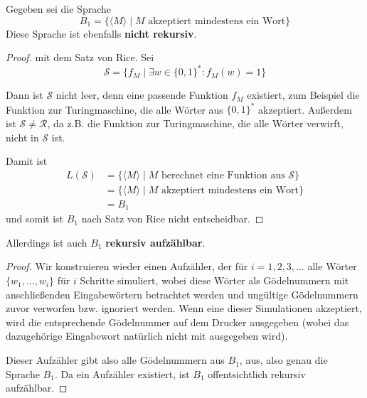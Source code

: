 Gegeben sei die Sprache
\[
	B_1 = \{ \langle M \rangle \mid M \text{ akzeptiert mindestens ein Wort} \}
\]
Diese Sprache ist ebenfalls \textbf{nicht rekursiv}.

\begin{proof} mit dem Satz von Rice.
Sei
\[
\mathcal{S} = \{f_M \mid \exists w \in \{0, 1\}^* : f_M(w) = 1\}
\]

Dann ist $\mathcal{S}$ nicht leer, denn eine passende Funktion $f_M$ existiert,
zum Beispiel die Funktion zur Turingmaschine, die alle Wörter aus $\{0, 1\}^*$
akzeptiert. Außerdem ist $\mathcal{S} \neq \mathcal{R}$, da z.B. die Funktion
zur Turingmaschine, die alle Wörter verwirft, nicht in $\mathcal{S}$ ist.

Damit ist
\begin{align*}
	L(\mathcal{S}) &= \{\langle M \rangle \mid M
		\text{ berechnet eine Funktion aus }\mathcal{S}\} \\
	&= \{\langle M \rangle \mid M \text{ akzeptiert mindestens ein Wort}\} \\
	&= B_1
\end{align*}
und somit ist $B_1$ nach Satz von Rice nicht entscheidbar.
\end{proof}

Allerdings ist auch $B_1$ \textbf{rekursiv aufzählbar}.

\begin{proof}
Wir konstruieren wieder einen Aufzähler, der für $i = 1, 2, 3, \dots$
alle Wörter $\{w_1, \dots, w_i\}$ für $i$ Schritte simuliert, wobei diese Wörter
als Gödelnummern mit anschließenden Eingabewörtern betrachtet werden und
ungültige Gödelnummern zuvor verworfen bzw. ignoriert werden. Wenn eine dieser
Simulationen akzeptiert, wird die entsprechende Gödelnummer auf dem Drucker
ausgegeben (wobei das dazugehörige Eingabewort natürlich nicht mit ausgegeben
wird).

Dieser Aufzähler gibt also alle Gödelnummern aus $B_1$, aus, also genau die
Sprache $B_1$. Da ein Aufzähler existiert, ist $B_1$ offentsichtlich rekursiv
aufzählbar.
\end{proof}
